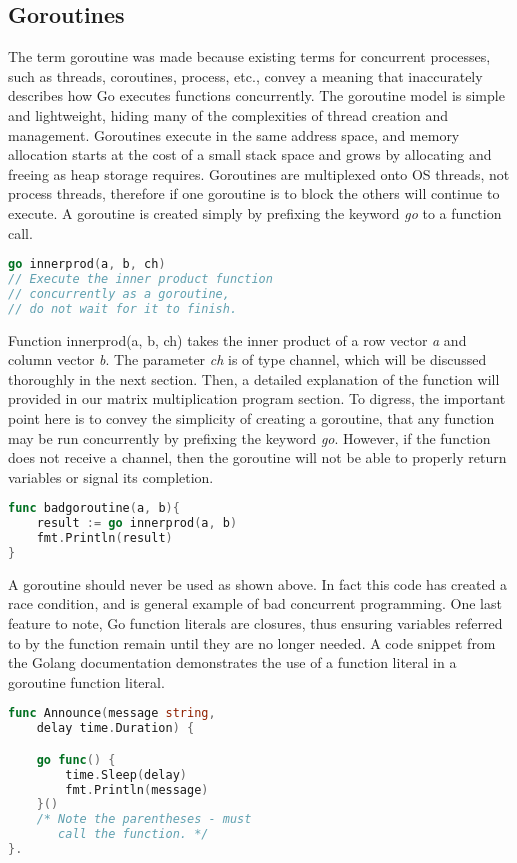 \subsection{Goroutines}
	The term goroutine was made because existing terms for concurrent processes, such as threads, coroutines, process, etc., convey a meaning that inaccurately describes how Go executes functions concurrently. The goroutine model is simple and lightweight, hiding many of the complexities of thread creation and management. Goroutines execute in the same address space, and memory allocation starts at the cost of a small stack space and grows by allocating and freeing as heap storage requires. Goroutines are multiplexed onto OS threads, not process threads, therefore if one goroutine is to block the others will continue to execute.\cite{website:go-lang-documentation}
	A goroutine is created simply by prefixing the keyword \emph{go} to a function call.	
\begin{lstlisting}[language=Go]
go innerprod(a, b, ch) 
// Execute the inner product function
// concurrently as a goroutine,
// do not wait for it to finish.
\end{lstlisting}
Function innerprod(a, b, ch) takes the inner product of a row vector \emph{a} and column vector \emph{b}. The parameter \emph{ch} is of type channel, which will be discussed thoroughly in the next section. Then, a detailed explanation of the function will provided in our matrix multiplication program section. To digress, the important point here is to convey the simplicity of creating a goroutine, that any function may be run concurrently by prefixing the keyword \emph{go}. However, if the function does not receive a channel, then the goroutine will not be able to properly return variables or signal its completion.
\begin{lstlisting}[language=Go]
func badgoroutine(a, b){
	result := go innerprod(a, b)
	fmt.Println(result)
}
\end{lstlisting}
A goroutine should never be used as shown above. In fact this code has created a race condition, and is general example of bad concurrent programming.
	One last feature to note, Go function literals are closures, thus ensuring variables referred to by the function remain until they are no longer needed. A code snippet from the Golang documentation demonstrates the use of a function literal in a goroutine function literal.
\begin{lstlisting}[language=Go]
func Announce(message string, 
	delay time.Duration) {

    go func() {
        time.Sleep(delay)
        fmt.Println(message)
    }()  
    /* Note the parentheses - must
       call the function. */
}.
\end{lstlisting}
